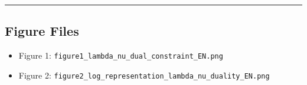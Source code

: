 \documentclass[
]{article}
\providecommand{\tightlist}{%
  \setlength{\itemsep}{0pt}\setlength{\parskip}{0pt}}
\begin{document}
\begin{center}\rule{0.5\linewidth}{0.5pt}\end{center}

\subsection{Figure Files}\label{figure-files}

\begin{itemize}
\tightlist
\item
  Figure 1: \texttt{figure1\_lambda\_nu\_dual\_constraint\_EN.png}
\item
  Figure 2:
  \texttt{figure2\_log\_representation\_lambda\_nu\_duality\_EN.png}
\end{itemize}
\end{document}
